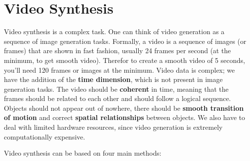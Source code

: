 \section{Video Synthesis}
\label{sec:video_synthesis}


Video synthesis is a complex task. One can think of video generation as a sequence of image generation tasks. Formally, a video is a sequence of images (or frames) that are shown in fast fashion, usually 24 frames per second (at the minimum, to get smooth video). Therefor to create a smooth video of 5 seconds, you'll need 120 frames or images at the minimum. Video data is complex; we have the addition of the \textbf{time dimension}, which is not present in image generation tasks. The video should be \textbf{coherent} in time, meaning that the frames should be related to each other and should follow a logical sequence. Objects should not appear out of nowhere, there should be \textbf{smooth transition of motion} and correct \textbf{spatial relationships} between objects. We also have to deal with limited hardware resources, since video generation is extremely computationally expensive.

% 



Video synthesis can be based on four main methods:

